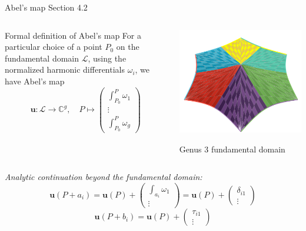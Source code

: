 \documentclass[11pt,aspectratio=169]{beamer}
\begin{document}
\begin{frame}[noframenumbering]{Abel's map}{\tiny \cite{Ber06} Section 4.2}
    \begin{columns}
        \begin{column}{0.55\textwidth}
            \begin{block}{Formal definition of Abel's map}
                For a particular choice of a point $P_0$ on the fundamental domain $\mathcal L$, using the normalized harmonic differentials $\omega_i$, we have Abel's map
                \[
                    \mathbf{u} : \mathcal L \rightarrow \mathbb{C}^g ,
                    \quad P \mapsto \begin{pmatrix} \int_{P_0}^P \omega_1 \\ \vdots \\ \int_{P_0}^P \omega_g \end{pmatrix}
                \]
            \end{block}
        \end{column}
        \begin{column}{0.45\textwidth}
            \center

            \includegraphics[width=0.7\columnwidth]{assets/Genus3Domain.png}

            \tiny Genus 3 fundamental domain
        \end{column}
    \end{columns}

    \emph{Analytic continuation beyond the fundamental domain:}
    \[\mathbf{u}(P+a_i) = \mathbf{u}(P) + \begin{pmatrix} \int_{a_i} \omega_1 \\ \vdots \end{pmatrix} = \mathbf{u}(P) + \begin{pmatrix} \delta_{i1} \\ \vdots \end{pmatrix}\]
    \[\mathbf{u}(P+b_i) = \mathbf{u}(P) + \begin{pmatrix} \tau_{i1} \\ \vdots \end{pmatrix}\]
\end{frame}
\end{document}

